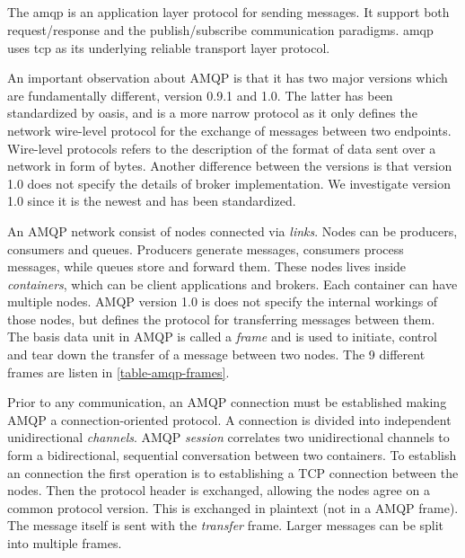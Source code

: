 \subsection{}

The \gls{amqp} is an application layer protocol for sending messages.
It support both request/response and the publish/subscribe communication
paradigms. \gls{amqp} uses \gls{tcp} as its underlying reliable transport layer
protocol.

 An important observation about AMQP is that it has two major versions which are
 fundamentally different, version 0.9.1 and 1.0. The latter has been
 standardized by \gls{oasis}\cite{oasis-amqp}, and is a  more narrow protocol as
 it only defines the network wire-level protocol for the exchange of messages
 between two endpoints. Wire-level protocols refers to the description of the
 format of data sent over a network in form of bytes. Another difference between
 the versions is that version 1.0 does not specify the details of broker
 implementation. We investigate version 1.0 since it is the newest and has been
 standardized.

An AMQP network consist of nodes connected via \textit{links}. Nodes can be
producers, consumers and queues. Producers generate messages, consumers process
messages, while queues store and forward them. These nodes lives inside
\textit{containers}, which can be client applications and brokers. Each
container can have multiple nodes. AMQP version 1.0 is does not specify the
internal workings of those nodes, but defines the protocol for transferring
messages between them. The basis data unit in AMQP is called a \textit{frame}
and is used to initiate, control and tear down the transfer of a message between
two nodes. The 9 different frames are listen in \cref{table-amqp-frames}.

Prior to any communication, an AMQP connection must be established making AMQP a
connection-oriented protocol. A connection is divided into independent
unidirectional \textit{channels}. AMQP \textit{session} correlates two
unidirectional channels to form a bidirectional, sequential conversation between
two containers. To establish an connection the first operation is to
establishing a TCP connection between the nodes. Then the protocol header is
exchanged, allowing the nodes agree on a common protocol version. This is
exchanged in plaintext (not in a AMQP frame). The message itself is sent with the
\textit{transfer} frame. Larger messages can be split into multiple frames.


